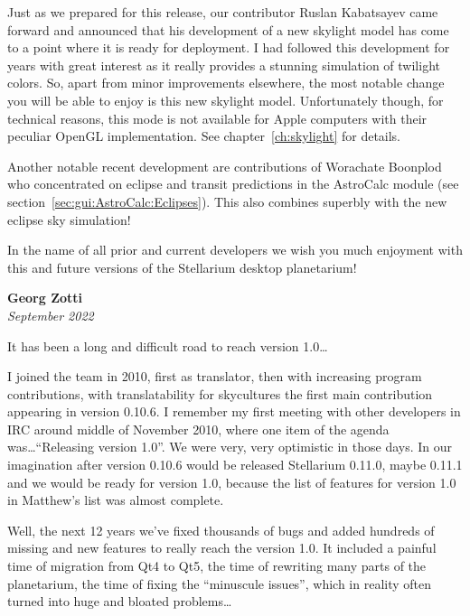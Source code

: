 Just as we prepared for this release, our contributor Ruslan
Kabatsayev came forward and announced that his development of a new skylight
model has come to a point where it is ready for deployment. I had
followed this development for years with great interest as it really
provides a stunning simulation of twilight colors. So, apart from minor
improvements elsewhere, the most notable change you will be able to
enjoy is this new skylight model. Unfortunately though, for technical
reasons, this mode is not available for Apple computers with their
peculiar OpenGL implementation.  See chapter~\ref{ch:skylight} for
details.

Another notable recent development are contributions of Worachate
Boonplod who concentrated on eclipse and transit predictions in the AstroCalc
module (see section~\ref{sec:gui:AstroCalc:Eclipses}).  This also
combines superbly with the new eclipse sky simulation!

\vspace{2\baselineskip}



\noindent In the name of all prior and current developers we wish you much enjoyment with
this and future versions of the Stellarium desktop planetarium!


\vspace{2\baselineskip}

\begin{flushright}
\textbf{Georg Zotti} \\ \emph{September 2022}
\end{flushright}

\vspace{2\baselineskip}

\noindent It has been a long and difficult road to reach version 1.0\ldots

I joined the team in 2010, first as translator, then with increasing
program contributions, with translatability for skycultures the first
main contribution appearing in version 0.10.6. I remember my first
meeting with other developers in IRC around middle of November 2010,
where one item of the agenda was\ldots ``Releasing version 1.0''. We were
very, very optimistic in those days. In our imagination after version
0.10.6 would be released Stellarium 0.11.0, maybe 0.11.1 and we would
be ready for version 1.0, because the list of features for version 1.0
in Matthew's list was almost complete.

Well, the next 12 years we've fixed thousands of bugs and added
hundreds of missing and new features to really reach the version
1.0. It included a painful time of migration from Qt4 to Qt5, the time
of rewriting many parts of the planetarium, the time of fixing the
``minuscule issues'', which in reality often turned into huge and
bloated problems\ldots

